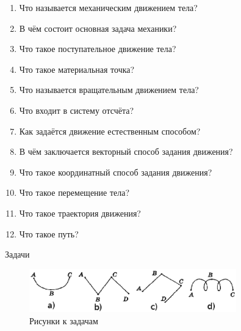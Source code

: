 \documentclass[a5paper, 10pt]{diss_4}
\renewcommand{\'}{\,'}
\begin{document}
\begin{enumerate}
\item Что называется механическим движением тела?
\item В чём состоит основная задача механики?
\item Что такое поступательное движение тела?
\item Что такое материальная точка?
\item Что называется вращательным движением тела?
\item Что входит в систему отсчёта?
\item Как задаётся движение естественным способом?
\item В чём заключается векторный способ задания движения?
\item Что такое координатный способ задания движения?
\item Что такое перемещение тела?
\item Что такое траектория движения?
\item Что такое путь?
\end{enumerate}

\begin{center}
   Задачи
\end{center}
\begin{figure}
\includegraphics[width=0.8\textwidth]{img/ex15.eps}
\caption{Рисунки к задачам}
\label{ris}
\end{figure}
\end{document}
